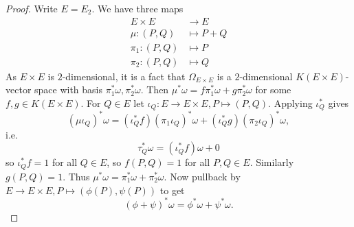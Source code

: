 \documentclass[a4paper]{article}
\theoremstyle{definition}
\begin{document}
\begin{proof}
  Write \(E = E_2\). We have three maps
  \begin{align*}
    E \times E &\to E \\
    \mu: (P, Q) &\mapsto P + Q \\
    \pi_1: (P, Q) &\mapsto P \\
    \pi_2: (P, Q) &\mapsto Q
  \end{align*}
  As \(E \times E\) is \(2\)-dimensional, it is a fact that \(\Omega_{E \times E}\) is a \(2\)-dimensional \(K(E \times E)\)-vector space with basis \(\pi_1^* \omega, \pi_2^* \omega\). Then \(\mu^* \omega = f \pi_1^* \omega + g \pi_2^* \omega\) for some \(f, g \in K(E \times E)\). For \(Q \in E\) let \(\iota_Q: E \to E \times E, P \mapsto (P, Q)\). Applying \(\iota_Q^*\) gives
  \[
    (\mu \iota_Q)^* \omega = (\iota_Q^* f) (\pi_1 \iota_Q)^* \omega + (\iota_Q^* g) (\pi_2 \iota_Q)^* \omega,
  \]
  i.e.
  \[
    \tau_Q^* \omega = (\iota_Q^* f) \omega + 0
  \]
  so \(\iota_Q^*f = 1\) for all \(Q \in E\), so \(f(P, Q) = 1\) for all \(P, Q \in E\). Similarly \(g(P, Q) = 1\). Thus \(\mu^*\omega = \pi_1^* \omega + \pi_2^* \omega\). Now pullback by \(E \to E \times E, P \mapsto (\phi(P), \psi(P))\) to get
  \[
    (\phi + \psi)^*\omega = \phi^*\omega + \psi^*\omega.
  \]
\end{proof}









\printindex
\end{document}
